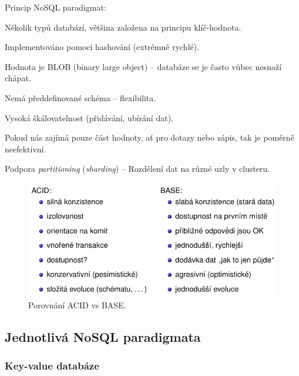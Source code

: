 \begin{compactitem}
    \item Princip NoSQL paradigmat: \begin{compactitem}
        \item Několik typů databází, většina založena na principu klíč-hodnota.
        \item Implementováno pomocí hashování (extrémně rychlé).
        \item Hodnota je BLOB (binary large object) -- databáze se je často vůbec nesnaží chápat.
        \item Nemá předdefinované schéma -- flexibilita.
        \item Vysoká škálovatelnost (přidávání, ubírání dat).
        \item Pokud nás zajímá pouze část hodnoty, ať pro dotazy nebo zápis, tak je poměrně neefektivní.
    \end{compactitem}

    \item Podpora \textit{partitioning} (\textit{sharding}) -- Rozdělení dat na různé uzly v clusteru.
\end{compactitem}

\begin{figure}[H]
    \centering
    \includegraphics[width=1\linewidth]{acid-vs-base.pdf}
    \caption{Porovnání ACID vs BASE.}
\end{figure}

\subsection{Jednotlivá NoSQL paradigmata}

\subsubsection*{Key-value databáze}

